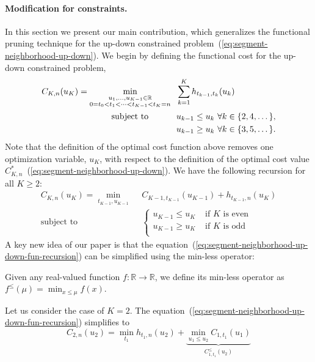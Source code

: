 \documentclass[twoside,11pt]{article}
\newcommand{\RR}{\mathbb R}
\begin{document}
\paragraph{Modification for constraints.} 
In this section we present our main contribution, which generalizes the functional pruning technique for the up-down constrained problem~(\ref{eq:segment-neighborhood-up-down}). We begin by defining the functional cost for the up-down constrained problem,
\begin{align}
  \label{eq:segment-neighborhood-up-down-fun}
C_{K,n}(u_K) = \min_{\substack{
u_1,\dots, u_{K-1}\in\RR
\\
0=t_0<t_1<\cdots<t_{K-1}<t_K=n
}} & \ \
  \sum_{k=1}^K
h_{t_{k-1}, t_k}(u_k)\\
      \text{subject to \hskip 0.8cm} &\ \ u_{k-1} \leq u_k\ \forall k\in\{2,4,\dots\},
  \nonumber\\
  &\ \ u_{k-1} \geq u_k\ \forall k\in\{3,5,\dots\}.
  \nonumber
\end{align}
Note that the definition of the optimal cost function above removes
one optimization variable, $u_K$, with respect to the definition of
the optimal cost value
$C^*_{K,n}$~(\ref{eq:segment-neighborhood-up-down}). We have the
following recursion for all $K\geq 2$:
\begin{align}
  \label{eq:segment-neighborhood-up-down-fun-recursion}
C_{K,n}(u_K) = \min_{t_{K-1},u_{K-1}} & \ \ 
  C_{K-1,t_{K-1}}(u_{K-1})+
h_{t_{K-1},n}(u_K)\\
      \text{subject to} &\ \   \begin{cases}
    u_{K-1}\leq u_K  & \text{ if $K$ is even}\\
    u_{K-1}\geq u_K  & \text{ if $K$ is odd}\\
  \end{cases}
  \nonumber
\end{align}
A key new idea of our paper is that the equation~(\ref{eq:segment-neighborhood-up-down-fun-recursion}) can be simplified using the min-less operator:
\begin{definition}[Min-less operator]
\label{def:min-less}
  Given any real-valued function $f:\RR\rightarrow\RR$, we define its min-less
  operator as $f^\leq(\mu)=\min_{x\leq \mu} f(x)$.
\end{definition}
Let us consider the case of $K=2$. The equation~(\ref{eq:segment-neighborhood-up-down-fun-recursion})
simplifies to
\begin{equation}
  \label{eq:segment-neighborhood-up-down-fun-recursion-K2}
C_{2,n}(u_2) = \min_{t_{1}} 
h_{t_{1},n}(u_2)+ \underbrace{
  \min_{u_1\leq u_2} C_{1,t_{1}}(u_{1}) 
}_{C_{1,t_{1}}^\leq(u_2)}
\end{equation}
\end{document}
